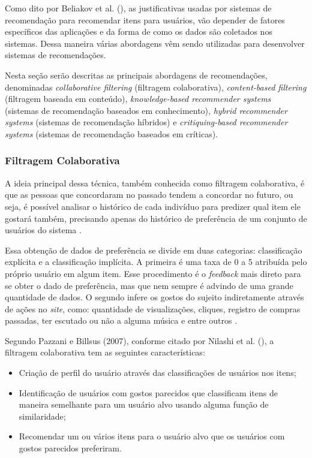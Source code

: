 Como dito por Beliakov et al. (\citeyear{Beliakov:2011}), as justificativas usadas por sistemas de recomendação para recomendar itens para usuários, vão depender de fatores específicos  das aplicações e da forma de como os dados são coletados nos sistemas. Dessa maneira várias abordagens vêm sendo utilizadas para desenvolver sistemas de recomendações.

Nesta seção serão descritas as principais abordagens de recomendações, denominadas \textit{collaborative filtering} (filtragem colaborativa), \textit{content-based filtering} (filtragem baseada em conteúdo), \textit{knowledge-based recommender systems} (sistemas de recomendação baseados em conhecimento), \textit{hybrid recommender systems} (sistemas de recomendação híbridos) e \textit{critiquing-based recommender systems} (sistemas de recomendação baseados em críticas).

\subsubsection{Filtragem Colaborativa} 
\label{Collaborativefiltering}
A ideia principal dessa técnica, também conhecida como filtragem colaborativa, é que as pessoas que concordaram no passado tendem a concordar no futuro, ou seja, é possível analisar o histórico de cada indivíduo para predizer qual item ele gostará também, precisando apenas do histórico de preferência de um conjunto de usuários do sistema \cite{Nilashi:2013}.

Essa obtenção de dados de preferência se divide em duas categorias: classificação explícita e a classificação implícita. A primeira é uma taxa de 0 a 5 atribuída pelo próprio usuário em algum item. Esse procedimento é o \textit{feedback} mais direto para se obter o dado de preferência, mas que nem sempre é advindo de uma grande quantidade de dados. O segundo infere os gostos do sujeito indiretamente através de ações no \textit{site}, como: quantidade de visualizações, cliques, registro de compras passadas, ter escutado ou não a alguma música e entre outros \cite{luo:2018}.
	
Segundo Pazzani e Billsus (2007), conforme citado por Nilashi et al. (\citeyear{Nilashi:2013}), a filtragem colaborativa tem as seguintes características:

\begin{itemize}
    \item Criação de perfil do usuário através das classificações de usuários nos itens;
    \item Identificação de usuários com gostos parecidos que classificam itens de maneira semelhante para um usuário alvo usando alguma função de similaridade;
    \item Recomendar um ou vários itens para o usuário alvo que os usuários com gostos parecidos preferiram.

\end{itemize}

